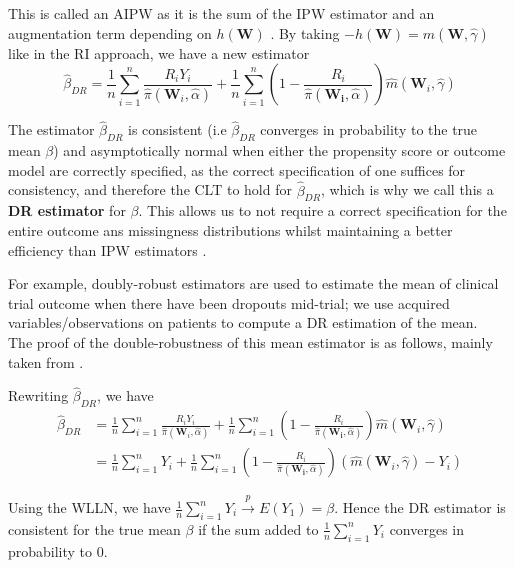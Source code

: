 \documentclass[12pt,twoside]{article}
\begin{document}
This is called an AIPW as it is the sum of the IPW estimator and an augmentation term depending on $h(\mathbf{W})$ \citep{davidian}. By taking $-h(\mathbf{W}) = \hat m(\mathbf{W}, \hat{\gamma})$ like in the RI approach, we have a new estimator
\begin{equation}
    \hat\beta_{DR} = \frac{1}{n}\sum_{i=1}^{n}\frac{R_iY_i}{\hat \pi(\mathbf{W}_i, \hat{\alpha})} + \frac{1}{n}\sum_{i=1}^{n} \left(1 - \frac{R_i}{\hat\pi(\mathbf{W_i},\hat{\alpha})} \right) \hat m(\mathbf{W}_i, \hat\gamma)
\end{equation}

The estimator $\hat\beta_{DR}$ is consistent (i.e $\hat\beta_{DR}$ converges in probability to the true mean $\beta$) and asymptotically normal when either the propensity score or outcome model are correctly specified, as the correct specification of one suffices for consistency, and therefore the CLT to hold for $\hat\beta_{DR}$, which is why we call this a \textbf{DR estimator} for $\beta$. This allows us to not require a correct specification for the entire outcome ans missingness distributions whilst maintaining a better efficiency than IPW estimators \citep{bangrobins,vansteelandt}.

For example, doubly-robust estimators are used to estimate the mean of clinical trial outcome when there have been dropouts mid-trial; we use acquired variables/observations on patients to compute a DR estimation of the mean. \\

The proof of the double-robustness of this mean estimator is as follows, mainly taken from \citet{vansteelandt}.

Rewriting $\hat{\beta}_{DR}$, we have
\begin{align*}
    \hat{\beta}_{DR} & = \frac{1}{n}\sum_{i=1}^{n}\frac{R_iY_i}{\hat\pi(\mathbf{W}_i, \hat{\alpha})} + \frac{1}{n}\sum_{i=1}^{n} \left(1 - \frac{R_i}{\hat\pi(\mathbf{W_i},\hat{\alpha})} \right) \hat m(\mathbf{W}_i, \hat\gamma) \\
    & = \frac{1}{n}\sum_{i=1}^{n} Y_i + \frac{1}{n}\sum_{i=1}^{n}\left(1 - \frac{R_i}{\hat\pi(\mathbf{W_i},\hat{\alpha})} \right) (\hat m(\mathbf{W}_i, \hat\gamma)-Y_i)
\end{align*}

Using the WLLN, we have $\frac{1}{n}\sum_{i=1}^{n} Y_i\xrightarrow{p} E(Y_1) = \beta$. Hence the DR estimator is consistent for the true mean $\beta$ if the sum added to $\frac{1}{n}\sum_{i=1}^{n} Y_i$ converges in probability to 0. \\
\end{document}
